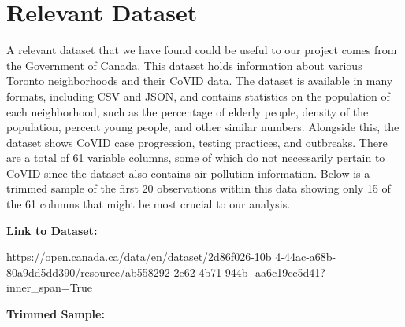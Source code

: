 \documentclass{article}
\begin{document}
    \section{Relevant Dataset}

    A relevant dataset that we have found could be useful to our project comes from the Government of Canada. This dataset holds information about various Toronto neighborhoods and their CoVID data. The dataset is available in many formats, including CSV and JSON, and contains statistics on the population of each neighborhood, such as the percentage of elderly people, density of the population, percent young people, and other similar numbers. Alongside this, the dataset shows CoVID case progression, testing practices, and outbreaks. There are a total of 61 variable columns, some of which do not necessarily pertain to CoVID since the dataset also contains air pollution information. Below is a trimmed sample of the first 20 observations within this data showing only 15 of the 61 columns that might be most crucial to our analysis.

    \bigskip

    \textbf{Link to Dataset:}

    https://open.canada.ca/data/en/dataset/2d86f026-10b
    4-44ac-a68b-80a9dd5dd390/resource/ab558292-2e62-4b71-944b-
    aa6c19cc5d41?inner\_span=True

    \bigskip

    \textbf{Trimmed Sample:}

    \bigskip
\end{document}
